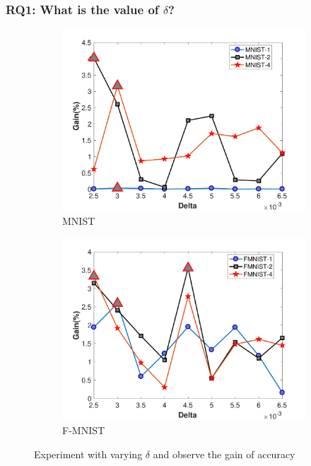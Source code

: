 \subsubsection{\textbf{RQ1: What is the value of $\delta$?}}
\begin{figure}
	\begin{subfigure}[b]{.46\linewidth}{}
		\includegraphics[keepaspectratio = True, scale = 0.31]{figures/MNIST_Delta}
		\centering
		\caption{MNIST}
	\end{subfigure}
	\begin{subfigure}[b]{.46\linewidth}
		\includegraphics[keepaspectratio = True, scale = 0.31]{figures/FMNIST_Delta}
		\caption{F-MNIST}
	\end{subfigure}
	\caption{Experiment with varying $\delta$ and observe the gain of accuracy}
	\label{fig:delta}
\end{figure}
